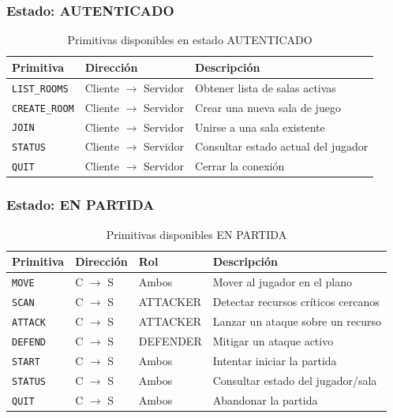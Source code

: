 \documentclass[12pt, letterpaper]{article}
\begin{document}
\subsubsection{Estado: AUTENTICADO}

\begin{table}[H]
\centering
\begin{tabularx}{\textwidth}{l l X}
\toprule
\textbf{Primitiva} & \textbf{Dirección} & \textbf{Descripción} \\
\midrule
\texttt{LIST\_ROOMS}  & Cliente $\rightarrow$ Servidor & Obtener lista de salas activas \\
\texttt{CREATE\_ROOM} & Cliente $\rightarrow$ Servidor & Crear una nueva sala de juego \\
\texttt{JOIN}         & Cliente $\rightarrow$ Servidor & Unirse a una sala existente \\
\texttt{STATUS}       & Cliente $\rightarrow$ Servidor & Consultar estado actual del jugador \\
\texttt{QUIT}         & Cliente $\rightarrow$ Servidor & Cerrar la conexión \\
\bottomrule
\end{tabularx}
\caption{Primitivas disponibles en estado AUTENTICADO}
\end{table}

\subsubsection{Estado: EN PARTIDA}

\begin{table}[H]
\centering
\begin{tabularx}{\textwidth}{l l l X}
\toprule
\textbf{Primitiva} & \textbf{Dirección} & \textbf{Rol} & \textbf{Descripción} \\
\midrule
\texttt{MOVE}   & C $\rightarrow$ S & Ambos    & Mover al jugador en el plano \\
\texttt{SCAN}   & C $\rightarrow$ S & ATTACKER & Detectar recursos críticos cercanos \\
\texttt{ATTACK} & C $\rightarrow$ S & ATTACKER & Lanzar un ataque sobre un recurso \\
\texttt{DEFEND} & C $\rightarrow$ S & DEFENDER & Mitigar un ataque activo \\
\texttt{START}  & C $\rightarrow$ S & Ambos    & Intentar iniciar la partida \\
\texttt{STATUS} & C $\rightarrow$ S & Ambos    & Consultar estado del jugador/sala \\
\texttt{QUIT}   & C $\rightarrow$ S & Ambos    & Abandonar la partida \\
\bottomrule
\end{tabularx}
\caption{Primitivas disponibles EN PARTIDA}
\end{table}
\end{document}
